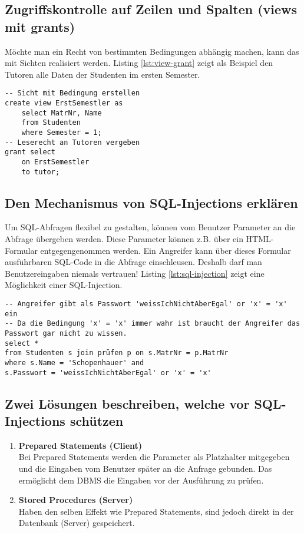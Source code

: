 \subsection{Zugriffskontrolle auf Zeilen und Spalten (views mit grants)}

Möchte man ein Recht von bestimmten Bedingungen abhängig machen, kann das mit Sichten realisiert werden. Listing \ref{lst:view-grant} zeigt als Beispiel den Tutoren alle Daten der Studenten im ersten Semester.

\begin{lstlisting}[caption={Rechte auf Zeilen und Spalten},label=lst:view-grant]
-- Sicht mit Bedingung erstellen
create view ErstSemestler as
	select MatrNr, Name
	from Studenten
	where Semester = 1;
-- Leserecht an Tutoren vergeben
grant select
	on ErstSemestler
	to tutor;
\end{lstlisting}

\subsection{Den Mechanismus von SQL-Injections erklären}

Um SQL-Abfragen flexibel zu gestalten, können vom Benutzer Parameter an die Abfrage übergeben werden. Diese Parameter können z.B. über ein HTML-Formular entgegengenommen werden. Ein Angreifer kann über dieses Formular ausführbaren SQL-Code in die Abfrage einschleusen. Deshalb darf man Benutzereingaben niemals vertrauen! Listing \ref{lst:sql-injection} zeigt eine Möglichkeit einer SQL-Injection.

\begin{lstlisting}[caption={SQL-Injection},label=lst:sql-injection]
-- Angreifer gibt als Passwort 'weissIchNichtAberEgal' or 'x' = 'x' ein
-- Da die Bedingung 'x' = 'x' immer wahr ist braucht der Angreifer das Passwort gar nicht zu wissen.
select *
from Studenten s join prüfen p on s.MatrNr = p.MatrNr
where s.Name = 'Schopenhauer' and
s.Passwort = 'weissIchNichtAberEgal' or 'x' = 'x'
\end{lstlisting}

\subsection{Zwei Lösungen beschreiben, welche vor SQL-Injections schützen}

\begin{enumerate}
	\item \textbf{Prepared Statements (Client)} \\
		  Bei Prepared Statements werden die Parameter als Platzhalter mitgegeben und die Eingaben vom Benutzer später an die Anfrage gebunden. Das ermöglicht dem \ac{DBMS} die Eingaben vor der Ausführung zu prüfen.
	\item \textbf{Stored Procedures (Server)} \\
		  Haben den selben Effekt wie Prepared Statements, sind jedoch direkt in der Datenbank (Server) gespeichert.
\end{enumerate}